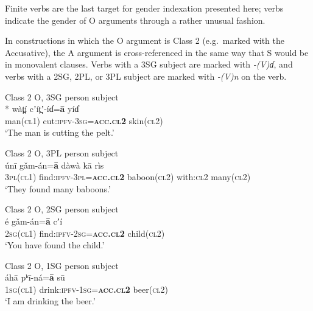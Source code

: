 \documentclass[output=collectionpaper,hidelinks]{langscibook}
\theoremstyle{remark}
\begin{document}
Finite verbs are the last target for gender indexation presented here; verbs
indicate the gender of O arguments through a rather unusual fashion.

In constructions in which the O argument is Class 2 (e.g.\ marked with the
Accusative), the A argument is cross-referenced in the same way that S would be
in monovalent clauses. Verbs with a 3SG subject are marked with \emph{-(V)ɗ},
and verbs with a 2SG, 2PL, or 3PL subject are marked with \emph{-(V)n} on the
verb.

\ea
\label{ex:Don:cut-pelt}
Class 2 O, 3SG person subject \\*
\gll wàt̪í cʼít̪ʼ-íɗ=\textbf{ā} yíɗ \\
 man(\textsc{cl1}) cut:\textsc{ipfv}-\textsc{3sg}=\textbf{\textsc{acc.cl2}} skin(\textsc{cl2}) \\
\glt `The man is cutting the pelt.' \\
\z

\ea
\label{ex:Don:find-baboons}
Class 2 O, 3PL person subject \\
\gll únī gǎm-án=\textbf{ā} dàwà kā rìs \\
 \textsc{3pl}(\textsc{cl1}) find:\textsc{ipfv}-\textsc{3pl}=\textbf{\textsc{acc.cl2}} baboon(\textsc{cl2}) with:\textsc{cl2} many(\textsc{cl2}) \\
\glt `They found many baboons.' \\
\z

\ea
\label{ex:Don:find-child}
Class 2 O, 2SG person subject \\
\gll é gǎm-án=\textbf{ā} cʼí \\
 \textsc{2sg}(\textsc{cl1}) find:\textsc{ipfv}-\textsc{2sg}=\textbf{\textsc{acc.cl2}} child(\textsc{cl2}) \\
\glt `You have found the child.' \\
\z

\ea
 Class 2 O, 1SG person subject \\
\gll áhā pʰī-ná=\textbf{ā} sū \\
 \textsc{1sg}(\textsc{cl1}) drink:\textsc{ipfv}-\textsc{1sg}=\textbf{\textsc{acc.cl2}} beer(\textsc{cl2}) \\
\glt `I am drinking the beer.' \\
\z
\end{document}

